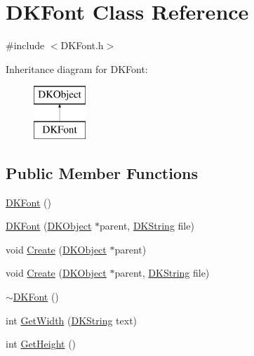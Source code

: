 \hypertarget{class_d_k_font}{\section{D\-K\-Font Class Reference}
\label{class_d_k_font}
}


{\ttfamily \#include $<$D\-K\-Font.\-h$>$}

Inheritance diagram for D\-K\-Font\-:\begin{figure}[H]
\begin{center}
\leavevmode
\includegraphics[height=2.000000cm]{class_d_k_font}
\end{center}
\end{figure}
\subsection*{Public Member Functions}
\begin{DoxyCompactItemize}
\item 
\hyperlink{class_d_k_font_a7687710524b92d0f29c6075e22ee55bd}{D\-K\-Font} ()
\item 
\hyperlink{class_d_k_font_ae971579674a3428152d2e107799b7714}{D\-K\-Font} (\hyperlink{class_d_k_object}{D\-K\-Object} $\ast$parent, \hyperlink{_d_k_string_8h_ac168e8555ceba18e1a2919b21976bc84}{D\-K\-String} file)
\item 
void \hyperlink{class_d_k_font_a4c9103d21e6f349f537730b53850a3a9}{Create} (\hyperlink{class_d_k_object}{D\-K\-Object} $\ast$parent)
\item 
void \hyperlink{class_d_k_font_a3b457f896a9f1b89e1ff2f0bc9a01afd}{Create} (\hyperlink{class_d_k_object}{D\-K\-Object} $\ast$parent, \hyperlink{_d_k_string_8h_ac168e8555ceba18e1a2919b21976bc84}{D\-K\-String} file)
\item 
\hyperlink{class_d_k_font_a687850edef92140bf5a2912286cdec80}{$\sim$\-D\-K\-Font} ()
\item 
int \hyperlink{class_d_k_font_a536d4437ebceb77912d51e11f5ab8aac}{Get\-Width} (\hyperlink{_d_k_string_8h_ac168e8555ceba18e1a2919b21976bc84}{D\-K\-String} text)
\item 
int \hyperlink{class_d_k_font_a1eb4acdb1cae276768e3e06f61275dfc}{Get\-Height} ()
\end{DoxyCompactItemize}
